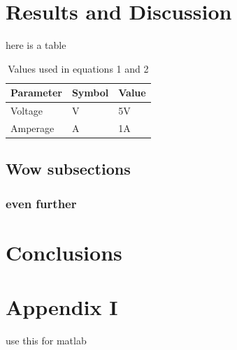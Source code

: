 \documentclass[a4paper,11pt]{MeLabtexMemo}
\begin{document}
\section{Results and Discussion}

here is a table 
\begin{longtable}{lll}
\caption{Values used in equations 1 and 2}
\label{tab:my-table}\\
Parameter & Symbol & Value \\
\endhead
%
Voltage & V & 5V \\
Amperage & A & 1A
\end{longtable}

\subsection{Wow subsections}
\subsubsection{even further}


\section{Conclusions}
\appendix
\section{Appendix I}
use this for matlab


 
\printbibliography %
\end{document}
